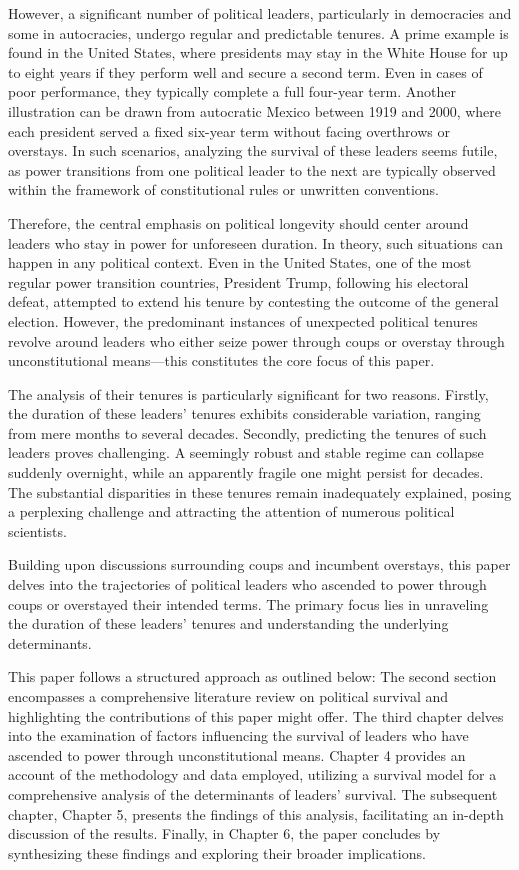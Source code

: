 \documentclass[
  12pt,
  a4paper,
  12pt]{article}
\begin{document}
However, a significant number of political leaders, particularly in
democracies and some in autocracies, undergo regular and predictable
tenures. A prime example is found in the United States, where presidents
may stay in the White House for up to eight years if they perform well
and secure a second term. Even in cases of poor performance, they
typically complete a full four-year term. Another illustration can be
drawn from autocratic Mexico between 1919 and 2000, where each president
served a fixed six-year term without facing overthrows or overstays. In
such scenarios, analyzing the survival of these leaders seems futile, as
power transitions from one political leader to the next are typically
observed within the framework of constitutional rules or unwritten
conventions.

Therefore, the central emphasis on political longevity should center
around leaders who stay in power for unforeseen duration. In theory,
such situations can happen in any political context. Even in the United
States, one of the most regular power transition countries, President
Trump, following his electoral defeat, attempted to extend his tenure by
contesting the outcome of the general election. However, the predominant
instances of unexpected political tenures revolve around leaders who
either seize power through coups or overstay through unconstitutional
means---this constitutes the core focus of this paper.

The analysis of their tenures is particularly significant for two
reasons. Firstly, the duration of these leaders' tenures exhibits
considerable variation, ranging from mere months to several decades.
Secondly, predicting the tenures of such leaders proves challenging. A
seemingly robust and stable regime can collapse suddenly overnight,
while an apparently fragile one might persist for decades. The
substantial disparities in these tenures remain inadequately explained,
posing a perplexing challenge and attracting the attention of numerous
political scientists.

Building upon discussions surrounding coups and incumbent overstays,
this paper delves into the trajectories of political leaders who
ascended to power through coups or overstayed their intended terms. The
primary focus lies in unraveling the duration of these leaders' tenures
and understanding the underlying determinants.

This paper follows a structured approach as outlined below: The second
section encompasses a comprehensive literature review on political
survival and highlighting the contributions of this paper might offer.
The third chapter delves into the examination of factors influencing the
survival of leaders who have ascended to power through unconstitutional
means. Chapter 4 provides an account of the methodology and data
employed, utilizing a survival model for a comprehensive analysis of the
determinants of leaders' survival. The subsequent chapter, Chapter 5,
presents the findings of this analysis, facilitating an in-depth
discussion of the results. Finally, in Chapter 6, the paper concludes by
synthesizing these findings and exploring their broader implications.
\end{document}
